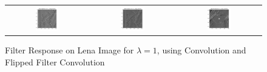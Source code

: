 \documentclass[a4paper]{article}
\begin{document}
\begin{figure}[!ht]
\centering
\begin{tabular}{ccc}
{\includegraphics[width=0.3\textwidth]{corr-filters/g1_conv_non}} &
{\includegraphics[width=0.3\textwidth]{corr-filters/g1_conv}} &
{\includegraphics[width=0.3\textwidth]{corr-filters/g1_conv_zoom}}
\end{tabular}
\caption{Filter Response on Lena Image for $\lambda=1$, using Convolution and Flipped Filter Convolution}
\end{figure}
\end{document}
